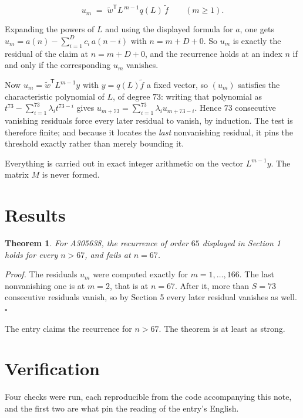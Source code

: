\documentclass[11pt]{article}
\newtheorem{theorem}{Theorem}
\theoremstyle{definition}
\begin{document}
\[u_m \;=\; \tilde w^{\mathsf T} L^{\,m-1} q(L)\,\tilde f \qquad (m \ge 1).\]

Expanding the powers of $L$ and using the displayed formula for $a$, one gets $u_m = a(n) - \sum_{i=1}^{D} c_i\,a(n-i)$ with $n = m + D + 0$. So $u_m$ is exactly the residual of the claim at $n = m + D + 0$, and the recurrence holds at an index $n$ if and only if the corresponding $u_m$ vanishes.

Now $u_m = \tilde w^{\mathsf T} L^{m-1} y$ with $y = q(L)\tilde f$ a fixed vector, so $(u_m)$ satisfies the characteristic polynomial of $L$, of degree $73$: writing that polynomial as $t^{73} - \sum_{i=1}^{73} \lambda_i t^{73-i}$ gives $u_{m+73} = \sum_{i=1}^{73} \lambda_i u_{m+73-i}$. Hence $73$ consecutive vanishing residuals force every later residual to vanish, by induction. The test is therefore finite; and because it locates the {\itshape last} nonvanishing residual, it pins the threshold exactly rather than merely bounding it.

Everything is carried out in exact integer arithmetic on the vector $L^{m-1}y$. The matrix $M$ is never formed.

\section{Results}

\begin{theorem} For A305638, the recurrence of order $65$ displayed in Section 1 holds for every $n > 67$, and fails at $n = 67$.\end{theorem}

{\itshape Proof.} The residuals $u_m$ were computed exactly for $m = 1,\dots,166$. The last nonvanishing one is at $m = 2$, that is at $n = 67$. After it, more than $S = 73$ consecutive residuals vanish, so by Section 5 every later residual vanishes as well. $\square$

The entry claims the recurrence for $n > 67$. The theorem is at least as strong.

\section{Verification}

Four checks were run, each reproducible from the code accompanying this note, and the first two are what pin the reading of the entry's English.
\end{document}
